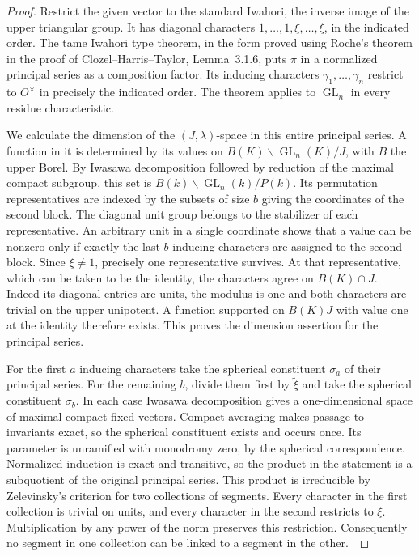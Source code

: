 \documentclass[a4paper,11pt]{article}
\theoremstyle{definition}
\theoremstyle{remark}
\numberwithin{equation}{section}
\newcommand{\GL}{\operatorname{GL}}
\begin{document}
\begin{proof}
Restrict the given vector to the standard Iwahori, the inverse
image of the upper triangular group. It has diagonal characters
\(1,\ldots,1,\xi,\ldots,\xi\), in the indicated order.
The tame Iwahori type theorem, in the form proved using Roche's
theorem in the proof of Clozel--Harris--Taylor, Lemma~3.1.6,
puts \(\pi\) in a normalized principal series as a composition
factor. Its inducing characters \(\gamma_1,\ldots,\gamma_n\)
restrict to \(O^\times\) in precisely the indicated order.
The theorem applies to \(\GL_n\) in every residue
characteristic.~\cite[Lemma 3.1.6 and its proof]{X-VII-VII-chttransfer721}

We calculate the dimension of the \((J,\lambda)\)-space in this
entire principal series. A function in it is determined by its
values on \(B(K)\backslash\GL_n(K)/J\), with \(B\) the upper
Borel. By Iwasawa decomposition followed by reduction of the
maximal compact subgroup, this set is \(B(k)\backslash\GL_n(k)/P(k)\).
Its permutation representatives are indexed by the subsets of size
\(b\) giving the coordinates of the second block. The diagonal
unit group belongs to the stabilizer of each representative.
An arbitrary unit in a single coordinate shows that a value can
be nonzero only if exactly the last \(b\) inducing characters are
assigned to the second block. Since \(\xi\ne1\), precisely one
representative survives. At that representative, which can be
taken to be the identity, the characters agree on \(B(K)\cap J\).
Indeed its diagonal entries are units, the modulus is one and
both characters are trivial on the upper unipotent. A function
supported on \(B(K)J\) with value one at the identity therefore
exists. This proves the dimension assertion for the principal series.

For the first \(a\) inducing characters take the spherical
constituent \(\sigma_a\) of their principal series. For the
remaining \(b\), divide them first by \(\widetilde\xi\) and take
the spherical constituent \(\sigma_b\). In each case Iwasawa
decomposition gives a one-dimensional space of maximal compact
fixed vectors. Compact averaging makes passage to invariants exact,
so the spherical constituent exists and occurs once. Its parameter is
unramified with monodromy zero, by the spherical correspondence.
Normalized induction is exact and transitive, so the product in the
statement is a subquotient of the original principal series. This
product is irreducible by Zelevinsky's criterion for two collections
of segments. Every character in the first collection is trivial
on units, and every character in the second restricts to \(\xi\).
Multiplication by any power of the norm preserves this restriction.
Consequently no segment in one collection can be linked to a segment
in the other.~\cite[Prop.~8.5]{X-VII-zelevinsky738}


\end{proof}
\end{document}
